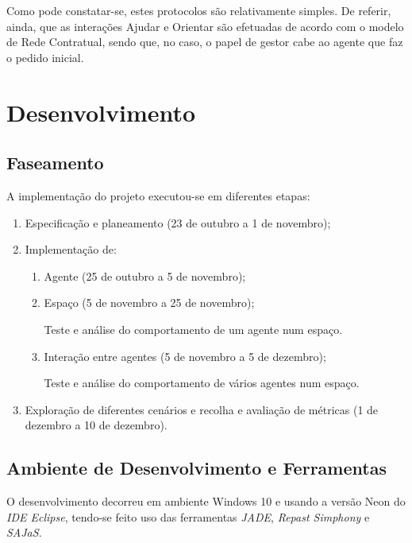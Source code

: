 \documentclass[12pt]{article}
\begin{document}
\begin{titlepage}
\begin{itemize}
\end{itemize}

Como pode constatar-se, estes protocolos são relativamente simples. De referir, ainda, que as interações Ajudar e Orientar são efetuadas de acordo com o modelo de Rede Contratual, sendo que, no caso, o papel de gestor cabe ao agente que faz o pedido inicial. 



\newpage
\section{Desenvolvimento}
\subsection{Faseamento}
A implementação do projeto executou-se em diferentes etapas:
\begin{enumerate}
	\item Especificação e planeamento (23 de outubro a 1 de novembro);
	\item Implementação de:
	 \begin{enumerate} 
	 	\item Agente (25 de outubro a 5 de novembro);
	 	\item Espaço (5 de novembro a 25 de novembro);
	 	
	 	Teste e análise do comportamento de um agente num espaço.
		\item Interação entre agentes (5 de novembro a 5 de dezembro);
		
		Teste e análise do comportamento de vários agentes num espaço. 
	\end{enumerate}
	\item Exploração de diferentes cenários e recolha e avaliação de métricas (1 de dezembro a 10 de dezembro).
\end{enumerate}

\subsection{Ambiente de Desenvolvimento e Ferramentas}
O desenvolvimento decorreu em ambiente Windows 10 e usando a versão Neon do \textit{IDE Eclipse}, tendo-se feito uso das ferramentas \textit{JADE}, \textit{Repast Simphony} e \textit{SAJaS}.
\newline


\end{titlepage}
\end{document}
